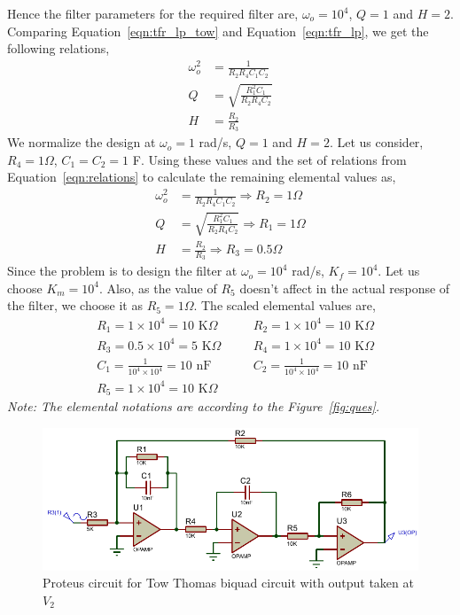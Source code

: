 \documentclass{lab_sheet}
\begin{document}
 Hence the filter parameters for the required filter are, $\omega_o=10^4$, $Q=1$ and $H=2$.
 Comparing Equation~\ref{eqn:tfr_lp_tow} and Equation~\ref{eqn:tfr_lp}, we get the following relations,
 \begin{equation}
     \begin{aligned}
        \omega_o^2&=\frac{1}{R_2R_4C_1C_2}\\
        Q&=\sqrt{\frac{R_1^2C_1}{R_2R_4C_2}}\\
        H&=\frac{R_2}{R_3}
     \end{aligned}
     \label{eqn:relations}
 \end{equation}
 We normalize the design at $\omega_o=1$ rad/s, $Q=1$ and $H=2$. Let us consider, $R_4=1\Omega$, $C_1=C_2=1$ F. Using these values and the set of relations from Equation~\ref{eqn:relations} to calculate the remaining elemental values as,
 \begin{equation*}
    \begin{aligned}
       \omega_o^2&=\frac{1}{R_2R_4C_1C_2}\Rightarrow R_2=1\Omega\\
       Q&=\sqrt{\frac{R_1^2C_1}{R_2R_4C_2}}\Rightarrow R_1=1\Omega\\
       H&=\frac{R_2}{R_3}\Rightarrow R_3=0.5\Omega
    \end{aligned}
\end{equation*}
 Since the problem is to design the filter at $\omega_o=10^4$ rad/s, $K_f=10^4$. Let us choose $K_m=10^4$. Also, as the value of $R_5$ doesn't affect in the actual response of the filter, we choose it as $R_5=1\Omega$. The scaled elemental values are,
 \begin{equation*}
    \begin{aligned}
       &R_1=1\times10^4=10 \text{ K}\Omega \quad &&R_2=1\times10^4=10 \text{ K}\Omega\\
       &R_3=0.5\times10^4=5 \text{ K}\Omega \quad &&R_4=1\times10^4=10 \text{ K}\Omega\\
       &C_1= \frac{1}{10^4\times10^4}=10\text{ nF} \quad && 
       C_2= \frac{1}{10^4\times10^4}=10\text{ nF}\\
       &R_5=1\times10^4=10 \text{ K}\Omega
    \end{aligned}
\end{equation*}
\textit{Note: The elemental notations are according to the Figure~\ref{fig:ques}.}
\begin{figure}[H]
    \centering
    \includegraphics[width=\linewidth]{../Figures/a_ckt}
    \caption{Proteus circuit for Tow Thomas biquad circuit with output taken at $V_2$}
    \label{fig:protA}
\end{figure}
\end{document}

